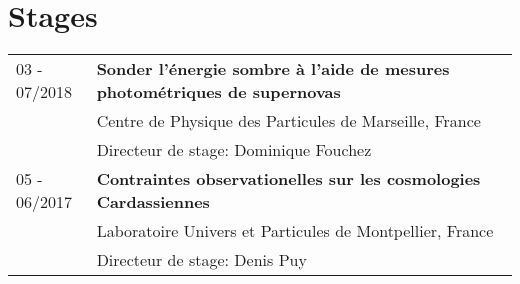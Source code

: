 \section{Stages}\label{internships}

\begin{table}[H]
    {\def\arraystretch{1.}\tabcolsep=0pt
    \begin{tabular}{p{0.16\linewidth}p{0.84\linewidth}}

    03 - 07/2018
        & \textbf{Sonder l'énergie sombre à l'aide de mesures photométriques de supernovas} \\
        & Centre de Physique des Particules de Marseille, France \\
        & Directeur de stage: Dominique Fouchez \\[5pt]

    05 - 06/2017
        & \textbf{Contraintes observationelles sur les cosmologies Cardassiennes} \\
        & Laboratoire Univers et Particules de Montpellier, France \\
        & Directeur de stage: Denis Puy \\ %


    \end{tabular}}
\end{table}
